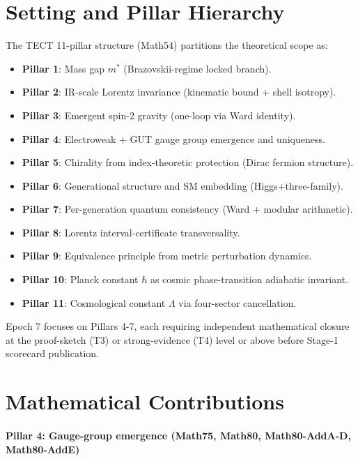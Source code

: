 \section{Setting and Pillar Hierarchy}
The TECT 11-pillar structure (Math54) partitions the theoretical scope as:
\begin{itemize}
\item \textbf{Pillar 1}: Mass gap $m^*$ (Brazovskii-regime locked branch).
\item \textbf{Pillar 2}: IR-scale Lorentz invariance (kinematic bound + shell isotropy).
\item \textbf{Pillar 3}: Emergent spin-2 gravity (one-loop via Ward identity).
\item \textbf{Pillar 4}: Electroweak + GUT gauge group emergence and uniqueness.
\item \textbf{Pillar 5}: Chirality from index-theoretic protection (Dirac fermion
  structure).
\item \textbf{Pillar 6}: Generational structure and SM embedding (Higgs+three-family).
\item \textbf{Pillar 7}: Per-generation quantum consistency (Ward + modular arithmetic).
\item \textbf{Pillar 8}: Lorentz interval-certificate transversality.
\item \textbf{Pillar 9}: Equivalence principle from metric perturbation dynamics.
\item \textbf{Pillar 10}: Planck constant $\hbar$ as cosmic phase-transition
  adiabatic invariant.
\item \textbf{Pillar 11}: Cosmological constant $\Lambda$ via four-sector cancellation.
\end{itemize}

Epoch 7 focuses on Pillars 4-7, each requiring independent mathematical closure
at the proof-sketch (T3) or strong-evidence (T4) level or above before
Stage-1 scorecard publication.

\section{Mathematical Contributions}

\paragraph{Pillar 4: Gauge-group emergence (Math75, Math80, Math80-AddA-D, Math80-AddE)}

